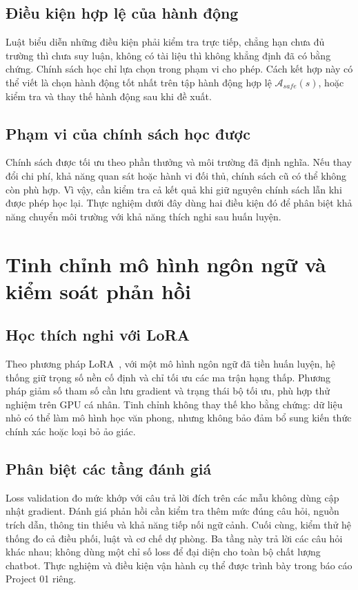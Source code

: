 \subsection{Điều kiện hợp lệ của hành động}
Luật biểu diễn những điều kiện phải kiểm tra trực tiếp, chẳng hạn chưa đủ trường thì chưa suy luận, không có tài liệu thì không khẳng định đã có bằng chứng. Chính sách học chỉ lựa chọn trong phạm vi cho phép. Cách kết hợp này có thể viết là chọn hành động tốt nhất trên tập hành động hợp lệ $\mathcal A_{safe}(s)$, hoặc kiểm tra và thay thế hành động sau khi đề xuất.

\subsection{Phạm vi của chính sách học được}
Chính sách được tối ưu theo phần thưởng và môi trường đã định nghĩa. Nếu thay đổi chi phí, khả năng quan sát hoặc hành vi đối thủ, chính sách cũ có thể không còn phù hợp. Vì vậy, cần kiểm tra cả kết quả khi giữ nguyên chính sách lẫn khi được phép học lại. Thực nghiệm dưới đây dùng hai điều kiện đó để phân biệt khả năng chuyển môi trường với khả năng thích nghi sau huấn luyện.


\section{Tinh chỉnh mô hình ngôn ngữ và kiểm soát phản hồi}
\subsection{Học thích nghi với LoRA}
Theo phương pháp LoRA~\cite{lora}, với một mô hình ngôn ngữ đã tiền huấn luyện, hệ thống giữ trọng số nền cố định và chỉ tối ưu các ma trận hạng thấp. Phương pháp giảm số tham số cần lưu gradient và trạng thái bộ tối ưu, phù hợp thử nghiệm trên GPU cá nhân. Tinh chỉnh không thay thế kho bằng chứng: dữ liệu nhỏ có thể làm mô hình học văn phong, nhưng không bảo đảm bổ sung kiến thức chính xác hoặc loại bỏ ảo giác.
\subsection{Phân biệt các tầng đánh giá}
Loss validation đo mức khớp với câu trả lời đích trên các mẫu không dùng cập nhật gradient. Đánh giá phản hồi cần kiểm tra thêm mức đúng câu hỏi, nguồn trích dẫn, thông tin thiếu và khả năng tiếp nối ngữ cảnh. Cuối cùng, kiểm thử hệ thống đo cả điều phối, luật và cơ chế dự phòng. Ba tầng này trả lời các câu hỏi khác nhau; không dùng một chỉ số loss để đại diện cho toàn bộ chất lượng chatbot. Thực nghiệm và điều kiện vận hành cụ thể được trình bày trong báo cáo Project 01 riêng.

